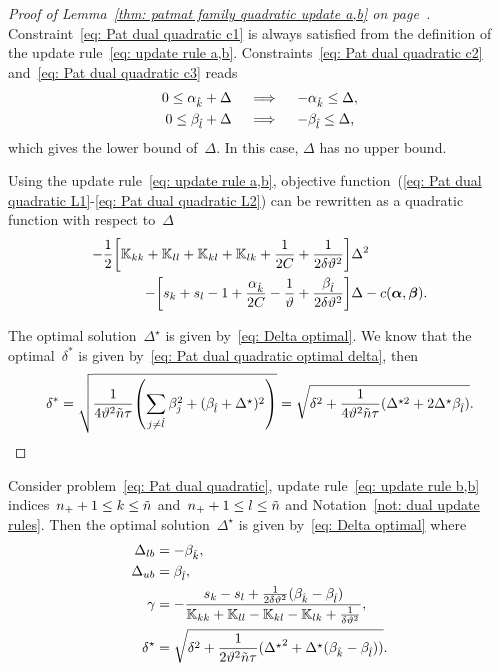 \begin{proof}[Proof of Lemma~\ref{thm: patmat family quadratic update a,b} on page~\pageref{thm: patmat family quadratic update a,b}]
  Constraint~\eqref{eq: Pat dual quadratic c1} is always satisfied from the definition of the update rule~\eqref{eq: update rule a,b}. Constraints~\eqref{eq: Pat dual quadratic c2} and~\eqref{eq: Pat dual quadratic c3} reads
  \begin{align*}
    0 \leq \alpha_{\hat{k}} + \Delta
    & \quad \implies \quad
    - \alpha_{\hat{k}} \leq \Delta, \\
    0 \leq \beta_{\hat{l}} + \Delta
    & \quad \implies \quad
    - \beta_{\hat{l}} \leq \Delta, \\
  \end{align*}
  which gives the lower bound of~$\Delta.$ In this case, $\Delta$ has no upper bound.
  
  Using the update rule~\eqref{eq: update rule a,b}, objective function~(\ref{eq: Pat dual quadratic L1}-\ref{eq: Pat dual quadratic L2}) can be rewritten as a quadratic function with respect to~$\Delta$
  \begin{align*}
    - \frac{1}{2} \Brac[s]{\K_{kk} + \K_{ll} + \K_{kl} + \K_{lk} + \frac{1}{2C} + \frac{1}{2 \delta \vartheta^2}} & \Delta^2 \\
    - \Brac[s]{s_k + s_l - 1 + \frac{\alphak}{2C} - \frac{1}{\vartheta} + \frac{\betal}{2\delta\vartheta^2}} & \Delta
    - c(\bm{\alpha}, \bm{\beta}).
  \end{align*}

  The optimal solution~$\Delta^{\star}$ is given by~\eqref{eq: Delta optimal}. We know that the optimal~$\delta^*$ is given by~\eqref{eq: Pat dual quadratic optimal delta}, then
  \begin{equation*}
    \delta^*
      = \sqrt{\frac{1}{4\vartheta^2 \ntil \tau} \Brac{\sum_{j\neq \hat{l}} \beta_j^2 + (\betal + \Delta^\star)^2}}
      = \sqrt{\delta^2 + \frac{1}{4\vartheta^2 \ntil \tau} (\Delta^{\star2} + 2\Delta^\star \betal)}.
  \end{equation*}
\end{proof}

\begin{lemma}\label{thm: patmat family quadratic update b,b}
  Consider problem~\eqref{eq: Pat dual quadratic}, update rule~\eqref{eq: update rule b,b} indices~$n_{+} + 1 \leq k \leq \tilde{n}$ and~$n_{+} + 1 \leq l \leq \tilde{n}$ and Notation~\ref{not: dual update rules}. Then the optimal solution~$\Delta^{\star}$ is given by~\eqref{eq: Delta optimal} where
  \begin{align*}
    \Delta_{lb} & = - \beta_{\hat{k}}, \\
    \Delta_{ub} & = \beta_{\hat{l}}, \\
    \gamma      & = -\frac{s_k - s_l + \frac{1}{2\delta \vartheta^2}(\beta_{\hat{k}} - \beta_{\hat{l}})}{\mathbb{K}_{kk} + \mathbb{K}_{ll} - \mathbb{K}_{kl} - \mathbb{K}_{lk} + \frac{1}{\delta \vartheta^2}}, \\
    \delta^{\star}  & = \sqrt{\delta^2 + \frac{1}{2 \vartheta^2 \tilde{n} \tau}({\Delta^{\star}}^2 + \Delta^{\star} (\beta_{\hat{k}} - \beta_{\hat{l}}))}.
  \end{align*}
\end{lemma}

